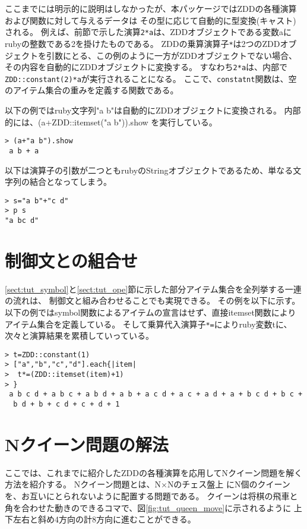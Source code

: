 ここまでには明示的に説明はしなかったが、本パッケージではZDDの各種演算および関数に対して与えるデータは
その型に応じて自動的に型変換(キャスト)される。
例えば、前節で示した演算\verb|2*a|は、ZDDオブジェクトである変数aにrubyの整数である2を掛けたものである。
ZDDの乗算演算子\verb|*|は2つのZDDオブジェクトを引数にとる、この例のように一方がZDDオブジェクトでない場合、
その内容を自動的にZDDオブジェクトに変換する。
すなわち\verb|2*a|は、内部で\verb|ZDD::constant(2)*a|が実行されることになる。
ここで、\verb|constatnt|関数は、空のアイテム集合の重みを定義する関数である。

以下の例ではruby文字列"a b"は自動的にZDDオブジェクトに変換される。
内部的には、(a+ZDD::itemset("a b")).show を実行している。
\begin{Verbatim}[baselinestretch=0.7,frame=single]
> (a+"a b").show
 a b + a
\end{Verbatim}

以下は演算子の引数が二つともrubyのStringオブジェクトであるため、単なる文字列の結合となってしまう。
\begin{Verbatim}[baselinestretch=0.7,frame=single]
> s="a b"+"c d"
> p s
"a bc d"
\end{Verbatim}

\section{制御文との組合せ}
\ref{sect:tut_symbol}と\ref{sect:tut_ope}節に示した部分アイテム集合を全列挙する一連の流れは、
制御文と組み合わせることでも実現できる。
その例を以下に示す。
以下の例ではsymbol関数によるアイテムの宣言はせず、直接itemset関数によりアイテム集合を定義している。
そして乗算代入演算子\verb|*=|によりruby変数tに、次々と演算結果を累積していっている。
\begin{Verbatim}[baselinestretch=0.7,frame=single]
> t=ZDD::constant(1)
> ["a","b","c","d"].each{|item|
>  t*=(ZDD::itemset(item)+1)
> }
 a b c d + a b c + a b d + a b + a c d + a c + a d + a + b c d + b c +
  b d + b + c d + c + d + 1
\end{Verbatim}

\section{Nクイーン問題の解法}
ここでは、これまでに紹介したZDDの各種演算を応用してNクイーン問題を解く方法を紹介する。
Nクイーン問題とは、N$\times$Nのチェス盤上
にN個のクイーンを、お互いにとられないように配置する問題である。
クイーンは将棋の飛車と角を合わせた動きのできるコマで、図\ref{fig:tut_queen_move}に示されるように
上下左右と斜め4方向の計8方向に進むことができる。

